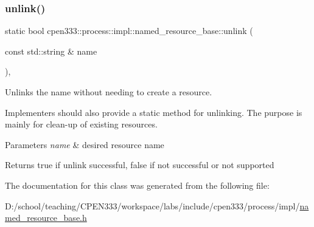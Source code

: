 \mbox{\label{classcpen333_1_1process_1_1impl_1_1named__resource__base_a47a1396cf7c8210e76431a4ba4725146}} 
\subsubsection{\texorpdfstring{unlink()}{unlink()}\hspace{0.1cm}{\footnotesize\ttfamily [2/2]}}
{\footnotesize\ttfamily static bool cpen333\+::process\+::impl\+::named\+\_\+resource\+\_\+base\+::unlink (\begin{DoxyParamCaption}\item[{const std\+::string \&}]{name }\end{DoxyParamCaption})\hspace{0.3cm}{\ttfamily [inline]}, {\ttfamily [static]}}



Unlinks the name without needing to create a resource. 

Implementers should also provide a static method for unlinking. The purpose is mainly for clean-\/up of existing resources.


\begin{DoxyParams}{Parameters}
{\em name} & desired resource name \\
\hline
\end{DoxyParams}
\begin{DoxyReturn}{Returns}
{\ttfamily true} if unlink successful, {\ttfamily false} if not successful or not supported 
\end{DoxyReturn}


The documentation for this class was generated from the following file\+:\begin{DoxyCompactItemize}
\item 
D\+:/school/teaching/\+C\+P\+E\+N333/workspace/labs/include/cpen333/process/impl/\hyperlink{named__resource__base_8h}{named\+\_\+resource\+\_\+base.\+h}\end{DoxyCompactItemize}
